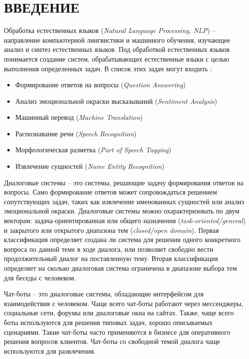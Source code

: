 \section*{ВВЕДЕНИЕ}
Обработка естественных языков (\textit{Natural Language Processing, NLP})
-- направление компьютерной лингвистики и машинного обучения,
изучающее анализ и синтез естественных языков.
Под обработкой естественных языков  понимается создание систем,
обрабатывающих естественные языки с целью выполнения определенных задач.
В список этих задач могут входить \cite{nlp.with.python}:
\begin{itemize}
    \item Формирование ответов на вопросы (\textit{Question Answering})
    \item Анализ эмоциональной окраски высказываний (\textit{Sentiment Analysis})
    \item Машинный перевод (\textit{Machine Translation})
    \item Распознавание речи (\textit{Speech Recognition})
    \item Морфологическая разметка (\textit{Part of Speech Tagging})
    \item Извлечение сущностей (\textit{Name Entity Recognition})
\end{itemize}

Диалоговые системы -- это системы, решающие задачу формирования ответов на вопросы.
Само формирование ответов может сопровождаться решением сопутствующих задач, таких как
извлечение именованных сущностей или анализ эмоциональной окраски.
Диалоговые системы можно охарактеризовать по двум векторам:
задача-ориентированная или общего назначения (\textit{task-oriented/general})
и закрытого или открытого диапазона тем (\textit{closed/open domain}).
Первая классификация определяет создана ли система для решения одного конкретного
вопроса по данной теме в ходе диалога, или позволяет свободно вести продолжительный
диалог на поставленную тему.
Вторая классификация определяет на сколько диалоговая система ограничена в диапазоне выбора тем
для беседы с человеком.

Чат-боты -- это диалоговые системы, обладающие интерфейсом для взаимодействия с человеком.
Чаще всего чат-боты работают через мессенджеры, социальные сети, форумы или диалоговые окна на сайтах.
Также, чаще всего боты используются для решения типовых задач, хорошо описываемых сценариями.
Такие чат-боты часто применяются в бизнесе для оперативного решения вопросов клиентов.
Чат-боты со свободной темой диалога чаще используются для развлечения.

